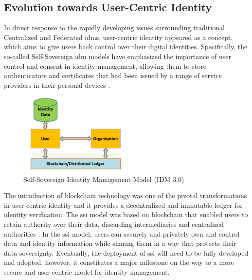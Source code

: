 \subsection{Evolution towards User-Centric Identity}

In direct response to the rapidly developing issues surrounding traditional Centralized and Federated \gls{idm}s, user-centric identity appeared as a concept, which 
aims to give users back control over their digital identities. Specifically, the so-called Self-Sovereign \gls{idm} models have emphasized the importance of user 
control and consent in identity management, allowing them to store authenticators and certificates that had been issued by a range of service providers in their personal 
devices \cite{9881610}.

\begin{figure}[h]  
  \centering
  \includegraphics[width=0.5\textwidth]{Images/c3_4.png} 
  \caption{Self-Sovereign Identity Management Model (IDM 3.0)}
\end{figure}

The introduction of blockchain technology was one of the pivotal transformations in user-centric identity and it provides a decentralized and immutable ledger for identity 
verification. The \gls{ssi} model was based on blockchain that enabled users to retain authority over their data, discarding intermediaries and centralized authorities 
\cite{9881610}. In the \gls{ssi} model, users can securely and privately own and control data and identity information while sharing them in a way that protects 
their data sovereignty. Eventually, the deployment of \gls{ssi} will need to be fully developed and adopted, however, it constitutes a major milestone on the way to a more 
secure and user-centric model for identity management.
